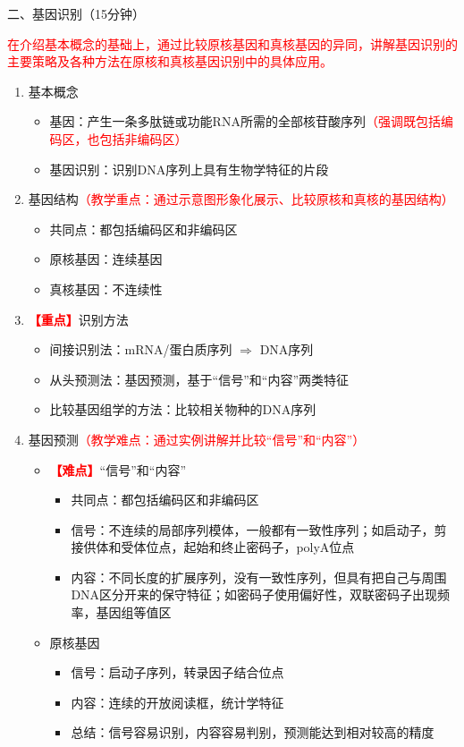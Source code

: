 \documentclass{TIJMUjiaoanLL}
\begin{document}
\vspace*{0.2cm}
\noindent
二、基因识别（15分钟）

\textcolor{red}{在介绍基本概念的基础上，通过比较原核基因和真核基因的异同，讲解基因识别的主要策略及各种方法在原核和真核基因识别中的具体应用。}

\begin{enumerate}
  \item 基本概念
    \begin{itemize}
      \item 基因：产生一条多肽链或功能RNA所需的全部核苷酸序列\textcolor{red}{（强调既包括编码区，也包括非编码区）}
      \item 基因识别：识别DNA序列上具有生物学特征的片段
    \end{itemize}
  \item 基因结构\textcolor{red}{（教学重点：通过示意图形象化展示、比较原核和真核的基因结构）}
    \begin{itemize}
      \item 共同点：都包括编码区和非编码区
      \item 原核基因：连续基因
      \item 真核基因：不连续性
    \end{itemize}
  \item \textcolor{red}{\textbf{【重点】}}识别方法
    \begin{itemize}
      \item 间接识别法：mRNA/蛋白质序列 $\Rightarrow$ DNA序列
      \item 从头预测法：基因预测，基于“信号”和“内容”两类特征
      \item 比较基因组学的方法：比较相关物种的DNA序列
    \end{itemize}
  \item 基因预测\textcolor{red}{（教学难点：通过实例讲解并比较“信号”和“内容”）}
    \begin{itemize}
      \item \textcolor{red}{\textbf{【难点】}}“信号”和“内容”
	\begin{itemize}
      \item 共同点：都包括编码区和非编码区
	  \item 信号：不连续的局部序列模体，一般都有一致性序列；如启动子，剪接供体和受体位点，起始和终止密码子，polyA位点
	  \item 内容：不同长度的扩展序列，没有一致性序列，但具有把自己与周围DNA区分开来的保守特征；如密码子使用偏好性，双联密码子出现频率，基因组等值区
	\end{itemize}
      \item 原核基因
	\begin{itemize}
	  \item 信号：启动子序列，转录因子结合位点
	  \item 内容：连续的开放阅读框，统计学特征
	  \item 总结：信号容易识别，内容容易判别，预测能达到相对较高的精度
	\end{itemize}
    \end{itemize}



\end{enumerate}
\end{document}
